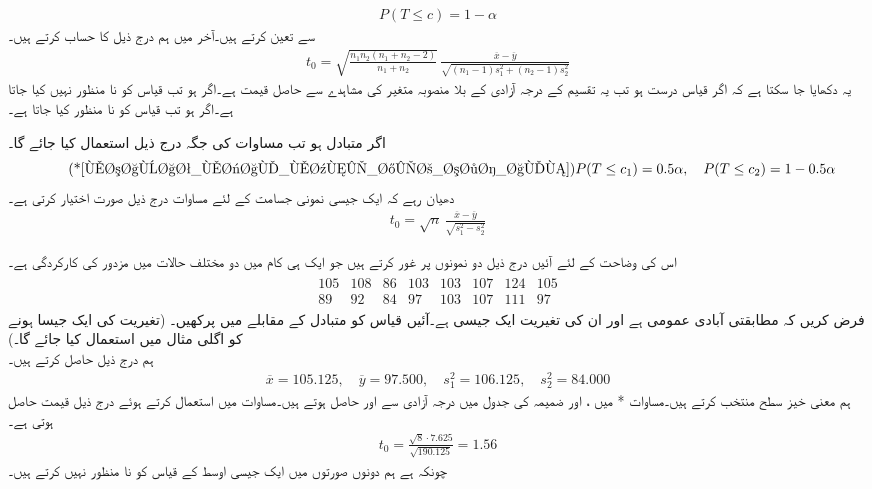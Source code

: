 \begin{align}\label{مساوات_مثال_معنی_خیز_سطح_الف}
P(T\le c)=1-\alpha
\end{align}
سے تعین کرتے ہیں۔آخر میں ہم درج ذیل کا حساب کرتے ہیں۔
\begin{align}\label{مساوات_مثال_معنی_خیز_سطح_ب}
t_0=\sqrt{\frac{n_1n_2(n_1+n_2-2)}{n_1+n_2}}\, \frac{\overline{x}-\overline{y}}{\sqrt{(n_1-1)s_1^2+(n_2-1)s_2^2}}
\end{align}
یہ دکھایا جا سکتا ہے کہ اگر قیاس درست ہو تب یہ   تقسیم کے   درجہ آزادی کے  بلا منصوبہ متغیر کی مشاہدے سے حاصل قیمت ہے۔اگر  ہو تب قیاس کو نا منظور نہیں کیا جاتا ہے۔اگر ہو تب قیاس کو نا منظور کیا جاتا ہے۔

اگر متبادل  ہو تب مساوات  کی جگہ درج ذیل استعمال کیا جائے گا۔
\begin{align*}\tag*{(*\ref{مساوات_مثال_معنی_خیز_سطح_الف})}
P(T\le c_1)=0.5\alpha,\quad P(T\le c_2)=1-0.5\alpha
\end{align*}
دھیان رہے کہ ایک جیسی نمونی جسامت  کے لئے  مساوات  درج ذیل صورت اختیار کرتی ہے۔
\begin{align}\label{مساوات_مثال_معنی_خیز_سطح_پ}
t_0=\sqrt{n}\,\frac{\overline{x}-\overline{y}}{\sqrt{s_1^2-s_2^2}}
\end{align}

اس کی وضاحت کے لئے آئیں درج ذیل دو نمونوں پر غور کرتے ہیں جو ایک ہی کام میں دو مختلف حالات میں مزدور کی کارکردگی ہے۔
\begin{align*}
\begin{array}{rrrrrrrr}
105&108&86&103&103&107&124&105\\
89&92&84&97&103&107&111&97
\end{array}
\end{align*}
فرض کریں کہ مطابقتی آبادی عمومی ہے اور ان کی تغیریت ایک جیسی ہے۔آئیں قیاس  کو متبادل  کے مقابلے میں پرکھیں۔ (تغیریت کی ایک جیسا ہونے کو اگلی مثال میں استعمال کیا جائے گا۔)\\
\quad
ہم درج ذیل حاصل کرتے ہیں۔
\begin{align*}
\overline{x}=105.125,\quad \overline{y}=97.500,\quad s_1^2=106.125,\quad s_2^2=84.000
\end{align*}
ہم معنی خیز سطح  منتخب کرتے ہیں۔مساوات * میں ،  اور  ضمیمہ  کی جدول  میں  درجہ آزادی سے  اور  حاصل ہوتے ہیں۔مساوات  میں  استعمال کرتے ہوئے درج ذیل قیمت حاصل ہوتی ہے۔
\begin{align*}
t_0=\frac{\sqrt{8}\cdot 7.625}{\sqrt{190.125}}=1.56
\end{align*}
چونکہ  ہے ہم دونوں صورتوں میں ایک جیسی اوسط کے  قیاس  کو نا منظور نہیں کرتے ہیں۔

